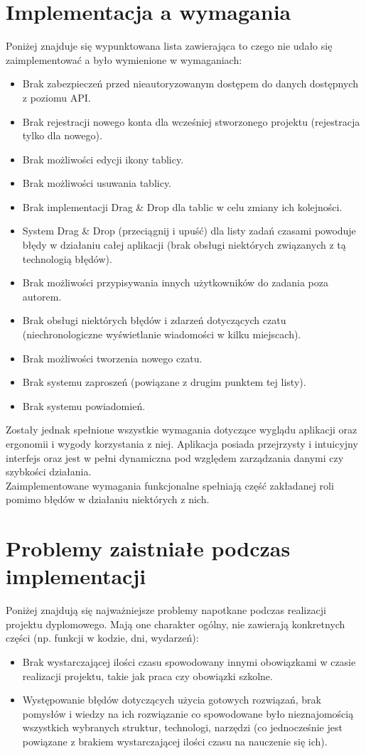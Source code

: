 \documentclass[eng,printmode]{mgr}
\begin{document}
\section{Implementacja a wymagania}
Poniżej znajduje się wypunktowana lista zawierająca to czego nie udało się zaimplementować a było wymienione w wymaganiach:
\begin{itemize}
  \item Brak zabezpieczeń przed nieautoryzowanym dostępem do danych dostępnych z poziomu API.
  \item Brak rejestracji nowego konta dla wcześniej stworzonego projektu (rejestracja tylko dla nowego). 
  \item Brak możliwości edycji ikony tablicy.
  \item Brak możliwości usuwania tablicy.
  \item Brak implementacji Drag \& Drop dla tablic w celu zmiany ich kolejności.
  \item System Drag \& Drop (przeciągnij i upuść) dla listy zadań czasami powoduje błędy w działaniu całej aplikacji (brak obsługi niektórych związanych z tą technologią błędów).
  \item Brak możliwości przypisywania innych użytkowników do zadania poza autorem.
  \item Brak obsługi niektórych błędów i zdarzeń dotyczących czatu (niechronologiczne wyświetlanie wiadomości w kilku miejscach).
  \item Brak możliwości tworzenia nowego czatu.
  \item Brak systemu zaproszeń (powiązane z drugim punktem tej listy).
  \item Brak systemu powiadomień.
\end{itemize}
Zostały jednak spełnione wszystkie wymagania dotyczące wyglądu aplikacji oraz ergonomii i wygody korzystania z niej. Aplikacja posiada przejrzysty i intuicyjny interfejs oraz jest w pełni dynamiczna pod względem zarządzania danymi czy szybkości działania. \\
Zaimplementowane wymagania funkcjonalne spełniają część zakładanej roli pomimo błędów w działaniu niektórych z nich.

\section{Problemy zaistniałe podczas implementacji}
Poniżej znajdują się najważniejsze problemy napotkane podczas realizacji projektu dyplomowego. Mają one charakter ogólny, nie zawierają konkretnych części (np. funkcji w kodzie, dni, wydarzeń):
\begin{itemize}
  \item Brak wystarczającej ilości czasu spowodowany innymi obowiązkami w czasie realizacji projektu, takie jak praca czy obowiązki szkolne.
  \item Występowanie błędów dotyczących użycia gotowych rozwiązań, brak pomysłów i wiedzy na ich rozwiązanie co spowodowane było nieznajomością wszystkich wybranych struktur, technologi, narzędzi (co jednocześnie jest powiązane z brakiem wystarczającej ilości czasu na nauczenie się ich).
\end{itemize}
\end{document}

